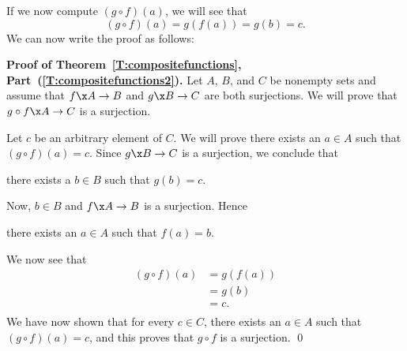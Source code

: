 \noindent
If we now compute  $( {g \circ f} )( a )$, we will see that
\[
( {g \circ f} )( a ) = g \left( f ( a ) \right) = g ( b ) = c.
\]
We can now write the proof as follows:
\eighth

\noindent
\textbf{Proof of Theorem~\ref{T:compositefunctions}, Part~(\ref{T:compositefunctions2}).}
Let  $A$, $B$, and  $C$  be nonempty sets and assume that  $f\x A \to B$  and  $g\x B \to C$  are both surjections.  We will prove that  $g \circ f\x A \to C$  is a surjection.

Let  $c$ be an arbitrary element of  $C$.  We will prove there exists an $a \in A$ such that 
$( g \circ f ) ( a ) = c$.  Since  $g\x B \to C$  is a surjection, we conclude that

\begin{center}
there exists a  $b \in B$  such that  $g( b ) = c$.
\end{center}

\noindent
Now, $b \in B$  and   $f\x A \to B$  is a surjection.  Hence 

\begin{center}
there exists an  $a \in A$  such that  $f( a ) = b$.
\end{center}

\noindent
We now  see that
\[
\begin{aligned}
  ( {g \circ f} )( a ) &= g\left( {f( a )} \right) \\ 
                       &= g( b ) \\ 
                       &= c. \\ 
\end{aligned} 
\]
We have now shown that for every  $c \in C$, there exists an  $a \in A$  such that  $( {g \circ f} )( a ) = c$, and this proves that  $g \circ f$  is a surjection. \qed
\hbreak


